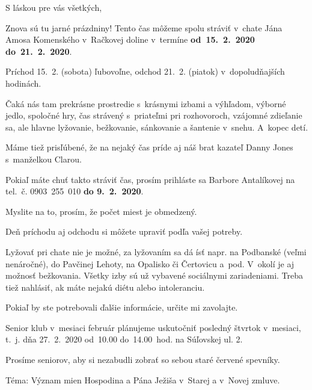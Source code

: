 S láskou pre vás všetkých,

\vfill\break


Znova sú tu jarné prázdniny! Tento čas môžeme spolu stráviť v~chate Jána Amosa Komenského v~Račkovej doline v~termíne {\bf od~15.~2.~2020 do~21.~2.~2020}.

Príchod 15.~2. (sobota) ľubovoľne, odchod 21.~2. (piatok) v~dopoludňajších hodinách.

Čaká nás tam prekrásne prostredie s~krásnymi izbami a výhľadom, výborné jedlo, spoločné hry, čas strávený s~priateľmi pri rozhovoroch, vzájomné zdieľanie sa, ale hlavne lyžovanie, bežkovanie, sánkovanie a šantenie v~snehu. A~kopec detí.

Máme tiež prisľúbené, že na nejaký čas príde aj náš brat kazateľ Danny Jones s~manželkou Clarou.

Pokiaľ máte chuť takto stráviť čas, prosím prihláste sa Barbore Antalíkovej na tel.~č. 0903~255~010 {\bf do 9.~2.~2020}.

Myslite na to, prosím, že počet miest je obmedzený.

Deň príchodu aj odchodu si môžete upraviť podľa vašej potreby.

Lyžovať pri chate nie je možné, za lyžovaním sa dá ísť napr. na Podbanské (veľmi nenáročné), do Pavčinej Lehoty, na Opalisko či Čertovicu a~pod. V~okolí je aj možnosť bežkovania.
\bigskip
{}
\bigskip
\hfil{}
\bigskip
Všetky izby sú už vybavené sociálnymi zariadeniami.
\bigskip
{}
\bigskip
\hfil{}
\bigskip
Treba tiež nahlásiť, ak máte nejakú diétu alebo intoleranciu.

Pokiaľ by ste potrebovali ďalšie informácie, určite mi zavolajte.



Senior klub v~mesiaci február plánujeme uskutočniť posledný štvrtok v~mesiaci, t.~j. dňa 27.~2.~2020 od~10.00 do~14.00~hod. na Súľovskej ul. 2.

Prosíme seniorov, aby si nezabudli zobrať so sebou staré červené spevníky.

Téma: Význam mien Hospodina a Pána Ježiša v~Starej a v~Novej zmluve.



